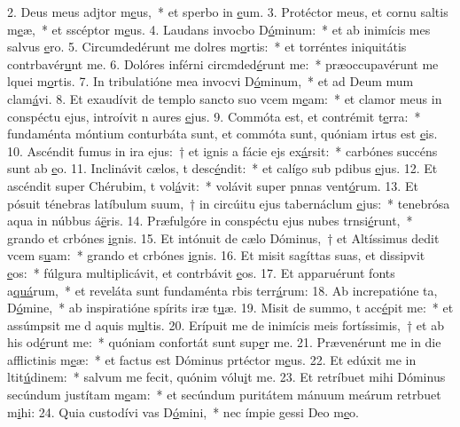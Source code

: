 2. Deus meus adjtor m\uline{e}us,~* et sperbo in \uline{e}um.
3. Protéctor meus, et cornu saltis m\uline{e}æ,~* et sscéptor m\uline{e}us.
4. Laudans invocbo D\uline{ó}minum:~* et ab inimícis mes salvus \uline{e}ro.
5. Circumdedérunt me dolres m\uline{o}rtis:~* et torréntes iniquitátis contrbavér\uline{u}nt me.
6. Dolóres inférni circmded\uline{é}runt me:~* præoccupavérunt me lquei m\uline{o}rtis.
7. In tribulatióne mea invocvi D\uline{ó}minum,~* et ad Deum mum clam\uline{á}vi.
8. Et exaudívit de templo sancto suo vcem m\uline{e}am:~* et clamor meus in conspéctu ejus, introívit n aures \uline{e}jus.
9. Commóta est, et contrémit t\uline{e}rra:~* fundaménta móntium conturbáta sunt, et commóta sunt, quóniam irtus est \uline{e}is.
10. Ascéndit fumus in ira ejus:~† et ignis a fácie ejs ex\uline{á}rsit:~* carbónes succéns sunt ab \uline{e}o.
11. Inclinávit cælos, t desc\uline{é}ndit:~* et calígo sub pdibus \uline{e}jus.
12. Et ascéndit super Chérubim, t vol\uline{á}vit:~* volávit super pnnas vent\uline{ó}rum.
13. Et pósuit ténebras latíbulum suum,~† in circúitu ejus tabernáclum \uline{e}jus:~* tenebrósa aqua in núbbus á\uline{ë}ris.
14. Præfulgóre in conspéctu ejus nubes trnsi\uline{é}runt,~* grando et crbónes \uline{i}gnis.
15. Et intónuit de cælo Dóminus,~† et Altíssimus dedit vcem s\uline{u}am:~* grando et crbónes \uline{i}gnis.
16. Et misit sagíttas suas, et dissipvit \uline{e}os:~* fúlgura multiplicávit, et contrbávit \uline{e}os.
17. Et apparuérunt fonts a\uline{quá}rum,~* et reveláta sunt fundaménta rbis terr\uline{á}rum:
18. Ab increpatióne ta, D\uline{ó}mine,~* ab inspiratióne spírits iræ t\uline{u}æ.
19. Misit de summo, t acc\uline{é}pit me:~* et assúmpsit me d aquis m\uline{u}ltis.
20. Erípuit me de inimícis meis fortíssimis,~† et ab his  od\uline{é}runt me:~* quóniam confortát sunt sup\uline{e}r me.
21. Prævenérunt me in die afflictinis m\uline{e}æ:~* et factus est Dóminus prtéctor m\uline{e}us.
22. Et edúxit me in ltit\uline{ú}dinem:~* salvum me fecit, quónim vólu\uline{i}t me.
23. Et retríbuet mihi Dóminus secúndum justítam m\uline{e}am:~* et secúndum puritátem mánuum meárum retrbuet m\uline{i}hi:
24. Quia custodívi vas D\uline{ó}mini,~* nec ímpie gessi  Deo m\uline{e}o.
